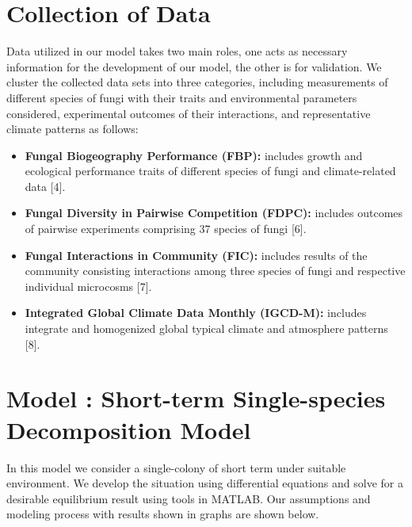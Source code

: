 \documentclass[12pt]{article}
\begin{document}
\section{Collection of Data}
Data utilized in our model takes two main roles, one acts as necessary information for the development of our model, the other is for validation. We cluster the collected data sets into three categories, including measurements of different species of fungi with their traits and environmental parameters considered, experimental outcomes of their interactions, and representative climate patterns as follows:
\begin{itemize}
	\item \textbf{Fungal Biogeography Performance (FBP):} includes growth and ecological performance traits of different species of fungi and climate-related data [4].
	\item \textbf{Fungal Diversity in Pairwise Competition  (FDPC):} includes outcomes of pairwise experiments comprising 37 species of fungi [6].
	\item \textbf{Fungal Interactions in Community (FIC):} includes results of the community consisting interactions among three species of fungi and respective individual microcosms [7].
	\item \textbf{Integrated Global Climate Data Monthly (IGCD-M):} includes integrate and homogenized global typical climate and atmosphere patterns [8].
\end{itemize}
\section{Model \uppercase\expandafter{}: Short-term Single-species Decomposition Model}
In this model we consider a single-colony of short term under suitable environment. We develop the situation using differential equations and solve for a desirable equilibrium result using tools in MATLAB. Our assumptions and modeling process with results shown in graphs are shown below.
\end{document}
